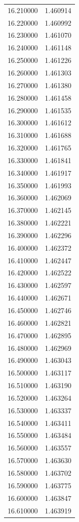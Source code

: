 \begin{tabular}{rr}
16.210000 & 1.460914 \\
16.220000 & 1.460992 \\
16.230000 & 1.461070 \\
16.240000 & 1.461148 \\
16.250000 & 1.461226 \\
16.260000 & 1.461303 \\
16.270000 & 1.461380 \\
16.280000 & 1.461458 \\
16.290000 & 1.461535 \\
16.300000 & 1.461612 \\
16.310000 & 1.461688 \\
16.320000 & 1.461765 \\
16.330000 & 1.461841 \\
16.340000 & 1.461917 \\
16.350000 & 1.461993 \\
16.360000 & 1.462069 \\
16.370000 & 1.462145 \\
16.380000 & 1.462221 \\
16.390000 & 1.462296 \\
16.400000 & 1.462372 \\
16.410000 & 1.462447 \\
16.420000 & 1.462522 \\
16.430000 & 1.462597 \\
16.440000 & 1.462671 \\
16.450000 & 1.462746 \\
16.460000 & 1.462821 \\
16.470000 & 1.462895 \\
16.480000 & 1.462969 \\
16.490000 & 1.463043 \\
16.500000 & 1.463117 \\
16.510000 & 1.463190 \\
16.520000 & 1.463264 \\
16.530000 & 1.463337 \\
16.540000 & 1.463411 \\
16.550000 & 1.463484 \\
16.560000 & 1.463557 \\
16.570000 & 1.463630 \\
16.580000 & 1.463702 \\
16.590000 & 1.463775 \\
16.600000 & 1.463847 \\
16.610000 & 1.463919 \\

\end{tabular}

